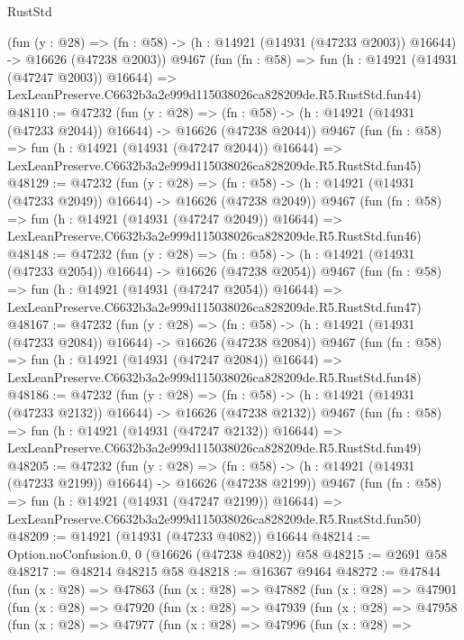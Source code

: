 \begin{lexlean}{RustStd}
\begin{coremodule}
    (fun (y : @28) =>
    (fn : @58) -> (h : @14921 (@14931 (@47233 @2003)) @16644) -> @16626 (@47238 @2003))
    @9467
    (fun (fn : @58) =>
    fun (h : @14921 (@14931 (@47247 @2003)) @16644) =>
    LexLeanPreserve.C6632b3a2e999d115038026ca828209de.R5.RustStd.fun44)
@48110 := @47232
    (fun (y : @28) =>
    (fn : @58) -> (h : @14921 (@14931 (@47233 @2044)) @16644) -> @16626 (@47238 @2044))
    @9467
    (fun (fn : @58) =>
    fun (h : @14921 (@14931 (@47247 @2044)) @16644) =>
    LexLeanPreserve.C6632b3a2e999d115038026ca828209de.R5.RustStd.fun45)
@48129 := @47232
    (fun (y : @28) =>
    (fn : @58) -> (h : @14921 (@14931 (@47233 @2049)) @16644) -> @16626 (@47238 @2049))
    @9467
    (fun (fn : @58) =>
    fun (h : @14921 (@14931 (@47247 @2049)) @16644) =>
    LexLeanPreserve.C6632b3a2e999d115038026ca828209de.R5.RustStd.fun46)
@48148 := @47232
    (fun (y : @28) =>
    (fn : @58) -> (h : @14921 (@14931 (@47233 @2054)) @16644) -> @16626 (@47238 @2054))
    @9467
    (fun (fn : @58) =>
    fun (h : @14921 (@14931 (@47247 @2054)) @16644) =>
    LexLeanPreserve.C6632b3a2e999d115038026ca828209de.R5.RustStd.fun47)
@48167 := @47232
    (fun (y : @28) =>
    (fn : @58) -> (h : @14921 (@14931 (@47233 @2084)) @16644) -> @16626 (@47238 @2084))
    @9467
    (fun (fn : @58) =>
    fun (h : @14921 (@14931 (@47247 @2084)) @16644) =>
    LexLeanPreserve.C6632b3a2e999d115038026ca828209de.R5.RustStd.fun48)
@48186 := @47232
    (fun (y : @28) =>
    (fn : @58) -> (h : @14921 (@14931 (@47233 @2132)) @16644) -> @16626 (@47238 @2132))
    @9467
    (fun (fn : @58) =>
    fun (h : @14921 (@14931 (@47247 @2132)) @16644) =>
    LexLeanPreserve.C6632b3a2e999d115038026ca828209de.R5.RustStd.fun49)
@48205 := @47232
    (fun (y : @28) =>
    (fn : @58) -> (h : @14921 (@14931 (@47233 @2199)) @16644) -> @16626 (@47238 @2199))
    @9467
    (fun (fn : @58) =>
    fun (h : @14921 (@14931 (@47247 @2199)) @16644) =>
    LexLeanPreserve.C6632b3a2e999d115038026ca828209de.R5.RustStd.fun50)
@48209 := @14921 (@14931 (@47233 @4082)) @16644
@48214 := Option.noConfusion.{0, 0} (@16626 (@47238 @4082)) @58
@48215 := @2691 @58
@48217 := @48214 @48215 @58
@48218 := @16367 @9464
@48272 := @47844
    (fun (x : @28) =>
    @47863
      (fun (x : @28) =>
      @47882
        (fun (x : @28) =>
        @47901
          (fun (x : @28) =>
          @47920
            (fun (x : @28) =>
            @47939
              (fun (x : @28) =>
              @47958
                (fun (x : @28) =>
                @47977
                  (fun (x : @28) =>
                  @47996
                    (fun (x : @28) =>

\end{coremodule}
\end{lexlean}
